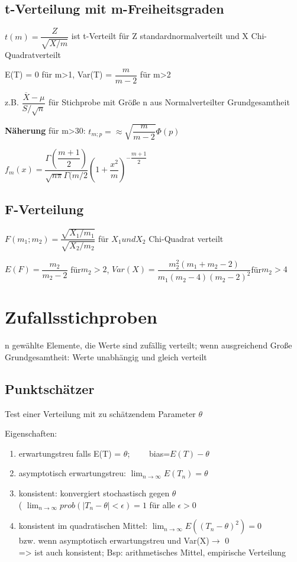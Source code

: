 \subsection*{t-Verteilung  mit m-Freiheitsgraden}
$t(m) = \dfrac{Z}{\sqrt{X/m}}$ ist t-Verteilt für Z standardnormalverteilt und X Chi-Quadratverteilt

E(T) = 0 für m>1, Var(T) = $\dfrac{m}{m-2}$ für m>2

z.B. $\dfrac{\overline{X} -\mu }{S/\sqrt{n}}$ für Stichprobe mit Größe n aus Normalverteilter Grundgesamtheit

\textbf{Näherung} für m>30: $t_{m;p} = \approx \sqrt{\dfrac{m}{m-2}} \Phi(p)$

$f_m(x) = \dfrac{\Gamma\left(\dfrac{m+1}{2}\right)}{\sqrt{n\pi}\Gamma( m/2} \left( 1+ \dfrac{x^2}{m}\right)^{-\dfrac{m+1}{2}}$

\subsection*{F-Verteilung}
$F(m_1;m_2) = \dfrac{\sqrt{X_1/m_1}}{\sqrt{X_2/m_2}}$ für $X_1 und X_2$ Chi-Quadrat verteilt

$E(F) = \dfrac{m_2}{m_2-2}$ für$ m_2 > 2$, $Var(X) = \dfrac{m_2^2(m_1+m_2-2)}{m_1(m_2-4)(m_2-2)^2} $für$ m_2 >4$

\section*{Zufallsstichproben}
n gewählte Elemente, die Werte sind zufällig verteilt; wenn ausgreichend Große Grundgesamtheit: Werte unabhängig und gleich verteilt

\subsection*{Punktschätzer}
Test einer Verteilung mit zu schätzendem Parameter $\theta$

Eigenschaften:
\begin{enumerate}
\item erwartungstreu falls E(T) = $\theta$;~~~~ bias=$E(T)-\theta$
\item asymptotisch erwartungstreu: $\lim_{n\rightarrow \infty} E(T_n) = \theta$
\item konsistent: konvergiert stochastisch gegen $\theta$ \\
( $\lim_{n\rightarrow \infty} prob (|T_n - \theta| <\epsilon ) = 1$ für alle $\epsilon >0 $
\item konsistent im quadratischen Mittel: $\lim_{n\rightarrow \infty} E((T_n-\theta)^2) = 0$\\
bzw. wenn asymptotisch erwartungstreu und Var(X)$\rightarrow$ 0 \\
=> ist auch konsistent; Bsp: arithmetisches Mittel, empirische Verteilung
\end{enumerate}

